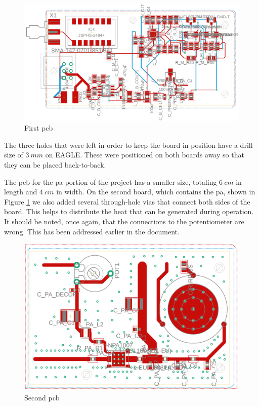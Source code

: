 \begin{figure}[H]
    \vspace*{0cm}
    \centering
    \includegraphics[width=0.8\linewidth]{figs/ch3_PCBlayout1.png}
    \caption{First \ac{pcb}}
    \label{fig:ch3_PCBlayout1.png}
\end{figure}

\par The three holes that were left in order to keep the board in position have a drill size of $3\:\si{mm}$ on EAGLE. These were positioned on both boards away so that they can be placed back-to-back. 

\par The \ac{pcb} for the \ac{pa} portion of the project has a smaller size, totaling $6\:\si{cm}$ in length and $4\:\si{cm}$ in width. On the second board, which contains the \ac{pa}, shown in Figure \ref{fig:ch3_PCBlayout1.png} we also added several through-hole vias that connect both sides of the board. This helps to distribute the heat that can be generated during operation. It should be noted, once again, that the connections to the potentiometer are wrong. This has been addressed earlier in the document.

\begin{figure}[H]
    \vspace*{0cm}
    \centering
    \includegraphics[width=0.8\linewidth]{figs/ch3_PCBlayout2.png}
    \caption{Second \ac{pcb}}
    \label{fig:ch3_PCBlayout2.png}
\end{figure}

